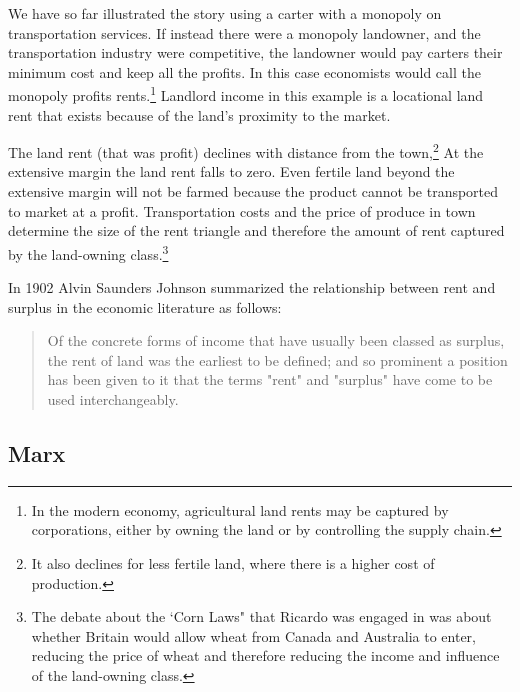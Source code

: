 We have so far illustrated the story using a carter with a monopoly on transportation services. If instead there were a monopoly landowner, and the transportation industry were competitive, the landowner would pay carters their minimum cost and keep all the profits. In this case economists would call the monopoly profits rents.\footnote{In the modern economy, agricultural land rents may be captured by corporations,  either by owning the land or by controlling the supply chain.}  Landlord income in this example is a locational land rent that exists because of the land's proximity to the market.  

The land rent (that was profit) declines with distance from the town,\footnote{%
It also declines for less fertile land, where there is a higher cost of production.} At the extensive margin the land rent falls to zero. Even fertile land beyond the extensive margin will not be farmed because the product cannot be transported to market at a profit. Transportation costs and the price of produce in town determine the size of the  rent triangle and therefore the amount of rent captured by the land-owning class.\footnote{The debate about the  `Corn Laws" that Ricardo  was engaged in was about whether Britain would allow wheat from Canada and Australia to enter, reducing the price of wheat and therefore reducing the income and influence of the land-owning class.} 



 

In 1902 Alvin Saunders Johnson \cite{johnsonRentModernEconomic1902} summarized the relationship between rent and surplus in the economic literature as follows: 

\begin{quotation}Of the concrete forms of income that have usually been classed as surplus, the rent of land was the earliest to be defined; and so prominent a position has been given to it that the terms "rent" and "surplus" have come to be used interchangeably.\end{quotation} 

\subsection{Marx}


